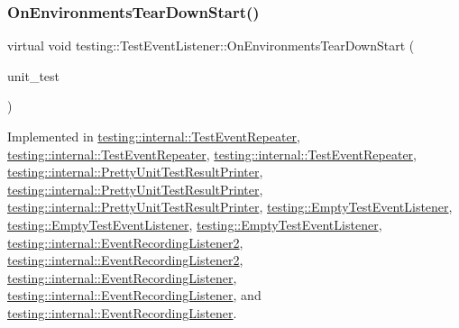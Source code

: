 \subsubsection{\texorpdfstring{OnEnvironmentsTearDownStart()}{OnEnvironmentsTearDownStart()}\hspace{0.1cm}{\footnotesize\ttfamily [1/3]}}
{\footnotesize\ttfamily virtual void testing\+::\+Test\+Event\+Listener\+::\+On\+Environments\+Tear\+Down\+Start (\begin{DoxyParamCaption}\item[{const \mbox{\hyperlink{classtesting_1_1_unit_test}{Unit\+Test}} \&}]{unit\+\_\+test }\end{DoxyParamCaption})\hspace{0.3cm}{\ttfamily [pure virtual]}}



Implemented in \mbox{\hyperlink{classtesting_1_1internal_1_1_test_event_repeater_aa2bf25212c9b1c09ed80b2bbcf55dbba}{testing\+::internal\+::\+Test\+Event\+Repeater}}, \mbox{\hyperlink{classtesting_1_1internal_1_1_test_event_repeater_aa2bf25212c9b1c09ed80b2bbcf55dbba}{testing\+::internal\+::\+Test\+Event\+Repeater}}, \mbox{\hyperlink{classtesting_1_1internal_1_1_test_event_repeater_a30db75df2d9a65d787f31e16004613c2}{testing\+::internal\+::\+Test\+Event\+Repeater}}, \mbox{\hyperlink{classtesting_1_1internal_1_1_pretty_unit_test_result_printer_a97efe483cbb1c55d32bdc7a997a99f13}{testing\+::internal\+::\+Pretty\+Unit\+Test\+Result\+Printer}}, \mbox{\hyperlink{classtesting_1_1internal_1_1_pretty_unit_test_result_printer_a97efe483cbb1c55d32bdc7a997a99f13}{testing\+::internal\+::\+Pretty\+Unit\+Test\+Result\+Printer}}, \mbox{\hyperlink{classtesting_1_1internal_1_1_pretty_unit_test_result_printer_a30703edd3f8a434035a4977eeb49918d}{testing\+::internal\+::\+Pretty\+Unit\+Test\+Result\+Printer}}, \mbox{\hyperlink{classtesting_1_1_empty_test_event_listener_a320780451eac9178434b7c77d948ecbd}{testing\+::\+Empty\+Test\+Event\+Listener}}, \mbox{\hyperlink{classtesting_1_1_empty_test_event_listener_a320780451eac9178434b7c77d948ecbd}{testing\+::\+Empty\+Test\+Event\+Listener}}, \mbox{\hyperlink{classtesting_1_1_empty_test_event_listener_a00fa1a4ea5831e20746188414268e7c6}{testing\+::\+Empty\+Test\+Event\+Listener}}, \mbox{\hyperlink{classtesting_1_1internal_1_1_event_recording_listener2_a9b29ac6408f671e6b0fcafba75238573}{testing\+::internal\+::\+Event\+Recording\+Listener2}}, \mbox{\hyperlink{classtesting_1_1internal_1_1_event_recording_listener2_a9b29ac6408f671e6b0fcafba75238573}{testing\+::internal\+::\+Event\+Recording\+Listener2}}, \mbox{\hyperlink{classtesting_1_1internal_1_1_event_recording_listener_aab8379a206927984cdb7b84399a122a5}{testing\+::internal\+::\+Event\+Recording\+Listener}}, \mbox{\hyperlink{classtesting_1_1internal_1_1_event_recording_listener_aab8379a206927984cdb7b84399a122a5}{testing\+::internal\+::\+Event\+Recording\+Listener}}, and \mbox{\hyperlink{classtesting_1_1internal_1_1_event_recording_listener_a17eebd7bb5cc6bab53b20794919ca5ae}{testing\+::internal\+::\+Event\+Recording\+Listener}}.


